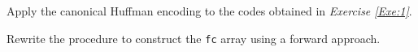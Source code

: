 \documentclass{subfiles}
\begin{document}
    \begin{exercise}
        Apply the canonical Huffman encoding to the codes obtained in \emph{Exercise \ref{Exe:1}}.
    \end{exercise}
    \begin{exercise}
        Rewrite the procedure to construct the \lstinline{fc} array using a forward approach.
    \end{exercise}
\end{document}
